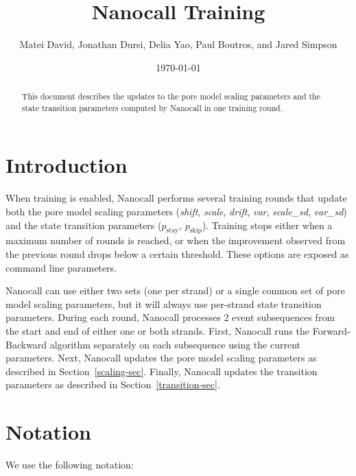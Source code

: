 \documentclass{article}
\newcommand{\pstay}{\ensuremath{p_\mathrm{stay}}}
\newcommand{\pskip}{\ensuremath{p_\mathrm{skip}}}
\begin{document}
\title{Nanocall Training}
\author{Matei David, Jonathan Dursi, Delia Yao, Paul Boutros, and Jared Simpson}
\date{\today}

\maketitle
\begin{abstract}
This document describes the updates to the pore model scaling parameters and the state transition parameters computed by Nanocall in one training round.
\end{abstract}

\section{Introduction}

When training is enabled, Nanocall performs several training rounds that update both the pore model scaling parameters (\emph{shift}, \emph{scale}, \emph{drift}, \emph{var}, \emph{scale\_sd}, \emph{var\_sd}) and the state transition parameters (\pstay, \pskip). Training stops either when a maximum number of rounds is reached, or when the improvement observed from the previous round drops below a certain threshold. These options are exposed as command line parameters.

Nanocall can use either two sets (one per strand) or a single common set of pore model scaling parameters, but it will always use per-strand state transition parameters. During each round, Nanocall processes 2 event subsequences from the start and end of either one or both strands. First, Nanocall runs the Forward-Backward algorithm separately on each subsequence using the current parameters. Next, Nanocall updates the pore model scaling parameters as described in Section~\ref{scaling-sec}. Finally, Nanocall updates the transition parameters as described in Section~\ref{transition-sec}.

\section{Notation}

We use the following notation:
\end{document}
